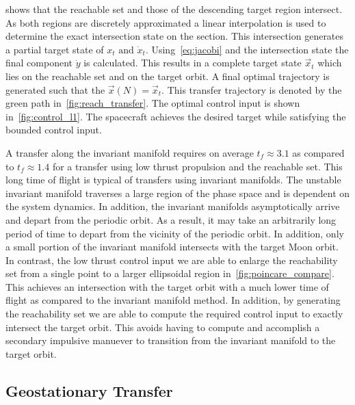 \documentclass[preprint]{elsarticle}
\begin{document}
 shows that the reachable set and those of the descending target region intersect.
As both regions are discretely approximated a linear interpolation is used to determine the exact intersection state on the \Poincare section.
This intersection generates a partial target state of \( x_t \text{ and } \dot{x}_t \).
Using~\cref{eq:jacobi} and the intersection state the final component \( \dot{y} \) is calculated. 
This results in a complete target state \( \vec{x}_t \) which lies on the reachable set and on the target orbit. 
A final optimal trajectory is generated such that the \( \vec{x}(N) = \vec{x}_t \).
This transfer trajectory is denoted by the green path in~\cref{fig:reach_transfer}.
The optimal control input is shown in~\cref{fig:control_l1}. 
The spacecraft achieves the desired target while satisfying the bounded control input.

A transfer along the invariant manifold requires on average \( t_f \approx 3.1 \) as compared to \( t_f \approx 1.4 \) for a transfer using low thrust propulsion and the reachable set.
This long time of flight is typical of transfers using invariant manifolds.
The unstable invariant manifold traverses a large region of the phase space and is dependent on the system dynamics. 
In addition, the invariant manifolds asymptotically arrive and depart from the periodic orbit. 
As a result, it may take an arbitrarily long period of time to depart from the vicinity of the periodic orbit.
In addition, only a small portion of the invariant manifold intersects with the target Moon orbit.
In contrast, the low thrust control input we are able to enlarge the reachability set from a single point to a larger ellipsoidal region in~\cref{fig:poincare_compare}.
This achieves an intersection with the target orbit with a much lower time of flight as compared to the invariant manifold method.
In addition, by generating the reachability set we are able to compute the required control input to exactly intersect the target orbit.
This avoids having to compute and accomplish a secondary impulsive manuever to transition from the invariant manifold to the target orbit.

\subsection{Geostationary Transfer}\label{sec:geo_transfer}
\end{document}
